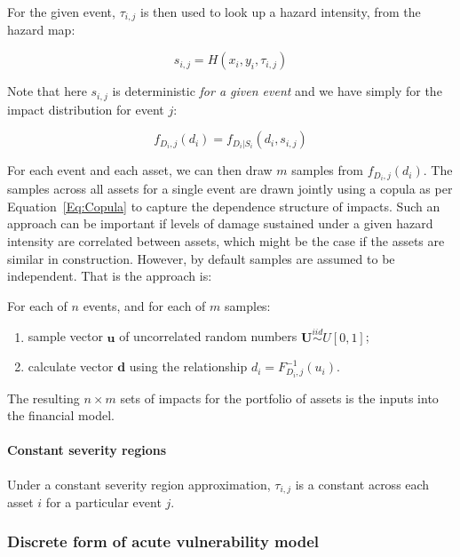\documentclass[a4paper,11pt]{extarticle} %
\theoremstyle{definition}
\begin{document}
For the given event, $\tau_{i, j}$ is then used to look up a hazard intensity, from the hazard map:

 \begin{equation}
    \label{Eq:Severity1}
    s_{i, j} = H(x_i, y_i, \tau_{i, j})
\end{equation}

Note that here $s_{i, j}$ is deterministic \emph{for a given event} and we have simply for the impact distribution for event $j$:

 \begin{equation}
    \label{Eq:Severity2}
    f_{D_i, j}(d_i) = f_{D_i|S_i}(d_i, s_{i, j})
\end{equation}

For each event and each asset, we can then draw $m$ samples from $f_{D_i, j}(d_i)$. The samples across all assets for a single event are drawn jointly using a copula as per Equation~\ref{Eq:Copula} to capture the dependence structure of impacts. Such an approach can be important if levels of damage sustained under a given hazard intensity are correlated between assets, which might be the case if the assets are similar in construction. However, by default samples are assumed to be independent. That is the approach is:

For each of $n$ events, and for each of $m$ samples:
\begin{enumerate}[]
    \item sample vector $\mathbf{u}$ of uncorrelated random numbers $\mathbf{U} \stackrel{iid}{\sim} U[0, 1]$;
    \item calculate vector $\mathbf{d}$ using the relationship $d_i = F_{D_i, j}^{-1}(u_i)$.
\end{enumerate}

The resulting $n \times m$ sets of impacts for the portfolio of assets is the inputs into the financial model.

\paragraph{Constant severity regions}
Under a constant severity region approximation, $\tau_{i, j}$ is a constant across each asset $i$ for a particular event $j$.


\subsubsection{Discrete form of acute vulnerability model}
\label{Sec:MathematicalDescriptionOfAssetImpactModel}
\end{document}
